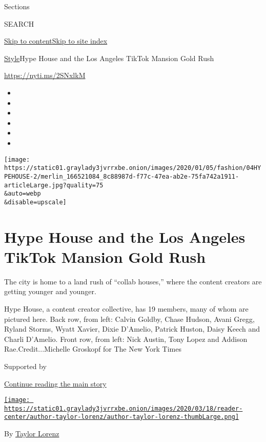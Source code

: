 Sections

SEARCH

\protect\hyperlink{site-content}{Skip to
content}\protect\hyperlink{site-index}{Skip to site index}

\href{/section/style}{Style}\textbar{}Hype House and the Los Angeles
TikTok Mansion Gold Rush

\url{https://nyti.ms/2SNxlkM}

\begin{itemize}
\item
\item
\item
\item
\item
\item
\end{itemize}

\texttt{[image: https://static01.graylady3jvrrxbe.onion/images/2020/01/05/fashion/04HYPEHOUSE-2/merlin\_166521084\_8c88987d-f77c-47ea-ab2e-75fa742a1911-articleLarge.jpg?quality=75\\\&auto=webp\\\&disable=upscale]}

\hypertarget{hype-house-and-the-los-angeles-tiktok-mansion-gold-rush}{%
\section{Hype House and the Los Angeles TikTok Mansion Gold
Rush}\label{hype-house-and-the-los-angeles-tiktok-mansion-gold-rush}}

The city is home to a land rush of ``collab houses,'' where the content
creators are getting younger and younger.

Hype House, a content creator collective, has 19 members, many of whom
are pictured here. Back row, from left: Calvin Goldby, Chase Hudson,
Avani Gregg, Ryland Storms, Wyatt Xavier, Dixie D'Amelio, Patrick
Huston, Daisy Keech and Charli D'Amelio. Front row, from left: Nick
Austin, Tony Lopez and Addison Rae.Credit...Michelle Groskopf for The
New York Times

Supported by

\protect\hyperlink{after-sponsor}{Continue reading the main story}

\href{https://www.nytimes3xbfgragh.onion/by/taylor-lorenz}{\texttt{[image: https://static01.graylady3jvrrxbe.onion/images/2020/03/18/reader-center/author-taylor-lorenz/author-taylor-lorenz-thumbLarge.png]}}

By \href{https://www.nytimes3xbfgragh.onion/by/taylor-lorenz}{Taylor
Lorenz}

